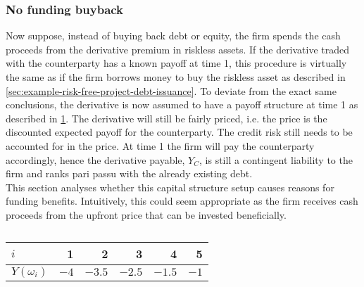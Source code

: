 \documentclass[../main.tex]{subfiles}
\begin{document}
        \subsubsection{No funding buyback}
            Now suppose, instead of buying back debt or equity, 
            the firm spends the cash proceeds from the derivative premium in riskless assets. 
            If the derivative traded with the counterparty has a known payoff at time 1, this procedure is virtually the same as if the firm borrows money to buy the riskless asset 
            as described in \cref{sec:example-risk-free-project-debt-issuance}. 
            To deviate from the exact same conclusions, the derivative is now assumed to have a payoff structure at time 1 
            as described in \cref{tbl:risky-option-payoff}. 
            The derivative will still be fairly priced, i.e. the price is the discounted expected payoff for the counterparty. 
            The credit risk still needs to be accounted for in the price. 
            At time 1 the firm will pay the counterparty accordingly, hence the derivative payable, $Y_C$, 
            is still a contingent liability to the firm and ranks pari passu with the already existing debt.
            \\
            This section analyses whether this capital structure setup causes reasons for funding benefits.
            Intuitively, this could seem appropriate as the firm receives cash proceeds from the upfront price that can be invested beneficially.
            
            \begin{table}[H]
                \centering
                \begin{tabular}{l|rrrrr}
                    $i$ & 1 & 2 & 3 & 4 & 5 \\
                    \hline
                    $Y(\omega_{i})$ & $\num{-4}$ & $\num{-3.5}$ & $\num{-2.5}$ & $\num{-1.5}$ & $\num{-1}$ \\
                \end{tabular}
                \caption{}
                \label{tbl:risky-option-payoff}
            \end{table}
\end{document}
